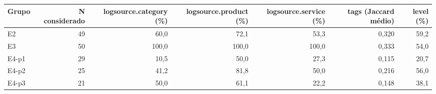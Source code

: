 \begin{tabular}{lrrrrrr}
\toprule
Grupo & N considerado & logsource.category (\%) & logsource.product (\%) & logsource.service (\%) & tags (Jaccard médio) & level (\%) \\
\midrule
E2 & 49 & 60,0 & 72,1 & 53,3 & 0,320 & 59,2 \\
E3 & 50 & 100,0 & 100,0 & 100,0 & 0,333 & 54,0 \\
E4-p1 & 29 & 10,5 & 50,0 & 27,3 & 0,115 & 20,7 \\
E4-p2 & 25 & 41,2 & 81,8 & 50,0 & 0,216 & 56,0 \\
E4-p3 & 21 & 50,0 & 61,1 & 22,2 & 0,148 & 38,1 \\
\bottomrule
\end{tabular}
